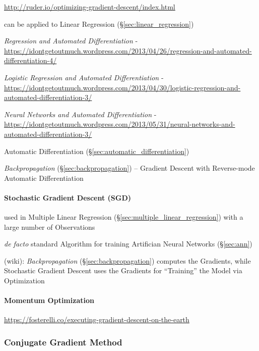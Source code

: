 \url{http://ruder.io/optimizing-gradient-descent/index.html}

can be applied to Linear Regression (\S\ref{sec:linear_regression})

\emph{Regression and Automated Differentiation} -
\url{https://idontgetoutmuch.wordpress.com/2013/04/26/regression-and-automated-differentiation-4/}

\emph{Logistic Regression and Automated Differentiation} -
\url{https://idontgetoutmuch.wordpress.com/2013/04/30/logistic-regression-and-automated-differentiation-3/}

\emph{Neural Networks and Automated Differentiation} -
\url{https://idontgetoutmuch.wordpress.com/2013/05/31/neural-networks-and-automated-differentiation-3/}

Automatic Differentiation (\S\ref{sec:automatic_differentiation})

\emph{Backpropagation} (\S\ref{sec:backpropagation}) -- Gradient Descent with
Reverse-mode Automatic Differentiation



\paragraph{Stochastic Gradient Descent (SGD)}\label{sec:sgd}\hfill

used in Multiple Linear Regression (\S\ref{sec:multiple_linear_regression}) with
a large number of Observations

\emph{de facto} standard Algorithm for training Artifician Neural Networks
(\S\ref{sec:ann})

(wiki): \emph{Backpropagation} (\S\ref{sec:backpropagation}) computes the
Gradients, while Stochastic Gradient Descent uses the Gradients for ``Training''
the Model via Optimization



\paragraph{Momentum Optimization}\label{sec:momentum_optmization}\hfill

\url{https://fosterelli.co/executing-gradient-descent-on-the-earth}



\subsubsection{Conjugate Gradient Method}\label{sec:conjugate_gradient_method}

